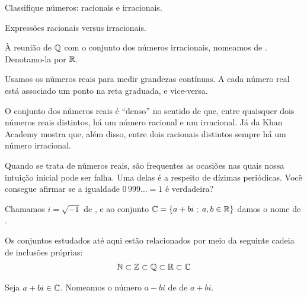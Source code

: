 \begin{onlineact}
	{Classifique números: racionais e irracionais}.
\end{onlineact}

\begin{onlineact}
	{Expressões racionais versus irracionais}.
\end{onlineact}

\begin{definition}
À reunião de $\mathbb{Q}$ com o conjunto dos números irracionais, nomeamos de . Denotamo-la por $\mathbb{R}$.
\end{definition}

Usamos os números reais para medir grandezas contínuas. A cada número real está associado um ponto na reta graduada, e vice-versa. 

O conjunto dos números reais é ``denso'' no sentido de que, entre quaisquer dois números reais distintos, há um número racional e um irracional. Já  da Khan Academy mostra que, além disso, entre dois racionais distintos sempre há um número irracional.

Quando se trata de números reais, são frequentes as ocasiões nas quais nossa intuição inicial pode ser falha. Uma delas é a respeito de dízimas periódicas. Você consegue afirmar se a igualdade $0\,999\ldots=1$ é verdadeira?

\begin{definition}
Chamamos $i = \sqrt {-1}$ de , e ao conjunto $\mathbb{C} = \left\{  a+bi \;;\; a,b \in \mathbb{R}\right\}$ damos o nome de .
\end{definition}

Os conjuntos estudados até aqui estão relacionados por meio da seguinte cadeia de inclusões próprias:
%
\begin{align*}
\mathbb{N} \subset \mathbb{Z} \subset \mathbb{Q} \subset \mathbb{R} \subset \mathbb{C}
\end{align*}

\begin{definition}
Seja $a+bi \in \mathbb{C}$. Nomeamos o número $a-bi$ de  de $a+bi$.
\end{definition}